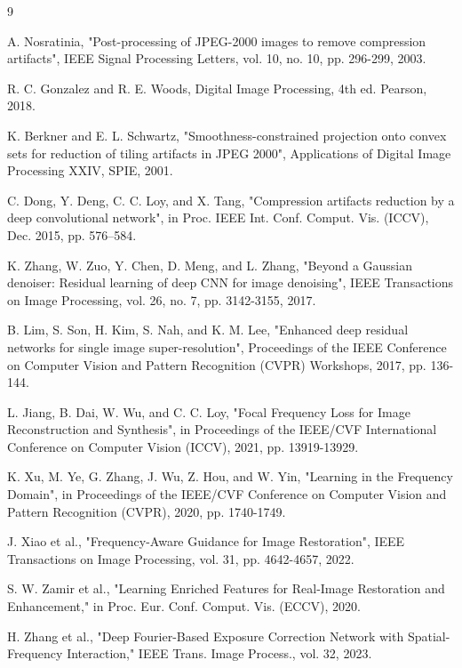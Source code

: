 \documentclass[12pt]{article}
\begin{document}
\renewcommand{\refname}{\selectfont References (Literature Review)} %
\begin{thebibliography}{9}

A. Nosratinia, "Post-processing of JPEG-2000 images to remove compression artifacts", IEEE Signal Processing Letters, vol. 10, no. 10, pp. 296-299, 2003.

R. C. Gonzalez and R. E. Woods, Digital Image Processing, 4th ed. Pearson, 2018.

K. Berkner and E. L. Schwartz, "Smoothness-constrained projection onto convex sets for reduction of tiling artifacts in JPEG 2000", Applications of Digital Image Processing XXIV, SPIE, 2001.

C. Dong, Y. Deng, C. C. Loy, and X. Tang, "Compression artifacts reduction by a deep convolutional network", in Proc. IEEE Int. Conf. Comput. Vis. (ICCV), Dec. 2015, pp. 576–584.

K. Zhang, W. Zuo, Y. Chen, D. Meng, and L. Zhang, "Beyond a Gaussian denoiser: Residual learning of deep CNN for image denoising", IEEE Transactions on Image Processing, vol. 26, no. 7, pp. 3142-3155, 2017.

B. Lim, S. Son, H. Kim, S. Nah, and K. M. Lee, "Enhanced deep residual networks for single image super-resolution", Proceedings of the IEEE Conference on Computer Vision and Pattern Recognition (CVPR) Workshops, 2017, pp. 136-144.

L. Jiang, B. Dai, W. Wu, and C. C. Loy, "Focal Frequency Loss for Image Reconstruction and Synthesis", in Proceedings of the IEEE/CVF International Conference on Computer Vision (ICCV), 2021, pp. 13919-13929.

K. Xu, M. Ye, G. Zhang, J. Wu, Z. Hou, and W. Yin, "Learning in the Frequency Domain", in Proceedings of the IEEE/CVF Conference on Computer Vision and Pattern Recognition (CVPR), 2020, pp. 1740-1749.

J. Xiao et al., "Frequency-Aware Guidance for Image Restoration", IEEE Transactions on Image Processing, vol. 31, pp. 4642-4657, 2022.

S. W. Zamir et al., "Learning Enriched Features for Real-Image Restoration and Enhancement," in Proc. Eur. Conf. Comput. Vis. (ECCV), 2020.

H. Zhang et al., "Deep Fourier-Based Exposure Correction Network with Spatial-Frequency Interaction," IEEE Trans. Image Process., vol. 32, 2023.


\end{thebibliography}
\end{document}
